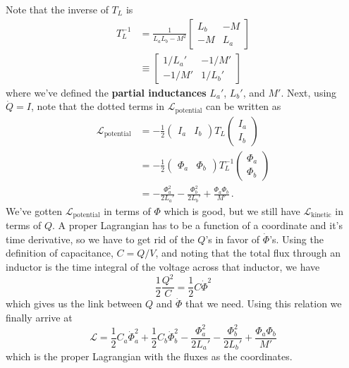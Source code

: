 Note that the inverse of $T_L$ is
\begin{align*}
  T_L^{-1}
  &= \frac{1}{L_a L_b - M^2}
  \left[ \begin{array}{cc}
    L_b & -M \\ -M & L_a
  \end{array} \right] \nonumber \\
  &\equiv \left[ \begin{array}{cc}
    1/L_a' & -1/M' \\ -1/M' & 1/L_b'
  \end{array} \right]
\end{align*}
where we've defined the \textbf{partial inductances} $L_a'$, $L_b'$, and $M'$.
Next, using $\dot{Q}=I$, note that the dotted terms in $\mathcal{L}_\text{potential}$ can be written as
\begin{align*}
  \mathcal{L}_\text{potential}
  &= -\frac{1}{2}
    \begin{pmatrix} I_a & I_b \end{pmatrix} T_L \begin{pmatrix} I_a \\ I_b \end{pmatrix} \\
  &= -\frac{1}{2}
    \begin{pmatrix} \Phi_a & \Phi_b \end{pmatrix}
    T_L^{-1}
    \begin{pmatrix} \Phi_a \\ \Phi_b \end{pmatrix} \\
  &= - \frac{\Phi_a^2}{2 L_a'} - \frac{\Phi_b^2}{2 L_b'} + \frac{\Phi_a \Phi_b}{M'}
  \, .
\end{align*}
We've gotten $\mathcal{L}_\text{potential}$ in terms of $\Phi$ which is good, but we still have $\mathcal{L}_\text{kinetic}$ in terms of $Q$.
A proper Lagrangian has to be a function of a coordinate and it's time derivative, so we have to get rid of the $Q$'s in favor of $\dot \Phi$'s.
Using the definition of capacitance, $C = Q/V$, and noting that the total flux through an inductor is the time integral of the voltage across that inductor, we have
\begin{equation*}
  \frac{1}{2}\frac{Q^2}{C} = \frac{1}{2}C \dot{\Phi}^2
\end{equation*}
which gives us the link between $Q$ and $\dot \Phi$ that we need.
Using this relation we finally arrive at
\begin{equation}
  \mathcal{L} =
  \frac{1}{2}C_a \dot{\Phi}_a^2 + \frac{1}{2}C_b \dot{\Phi}_b^2
  - \frac{\Phi_a^2}{2L_a'} - \frac{\Phi_b^2}{2L_b'}
  + \frac{\Phi_a \Phi_b}{M'}
\end{equation}
which is the proper Lagrangian with the fluxes as the coordinates.

